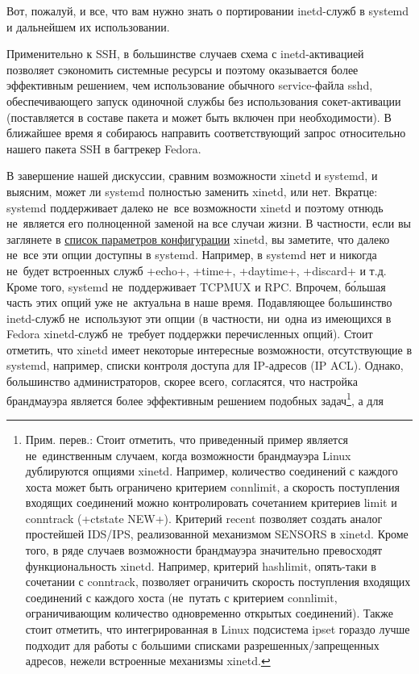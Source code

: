 \documentclass[10pt,oneside,a4paper]{article}
\begin{document}
Вот, пожалуй, и все, что вам нужно знать о портировании inetd-служб в systemd и
дальнейшем их использовании.

Применительно к SSH, в большинстве случаев схема с inetd-активацией позволяет
сэкономить системные ресурсы и поэтому оказывается более эффективным решением,
чем использование обычного service-файла sshd, обеспечивающего запуск одиночной
службы без использования сокет-активации (поставляется в составе пакета и может
быть включен при необходимости). В ближайшее время я собираюсь направить
соответствующий запрос относительно нашего пакета SSH в багтрекер Fedora.

В завершение нашей дискуссии, сравним возможности xinetd и systemd, и выясним,
может ли systemd полностью заменить xinetd, или нет. Вкратце: systemd
поддерживает далеко не~все возможности xinetd и поэтому отнюдь не~является его
полноценной заменой на все случаи жизни. В частности, если вы заглянете в
\href{http://linux.die.net/man/5/xinetd.conf}{список параметров конфигурации}
xinetd, вы заметите, что далеко не~все эти опции доступны в systemd. Например, в
systemd нет и никогда не~будет встроенных служб +echo+, +time+, +daytime+,
+discard+ и т.д. Кроме того, systemd не~поддерживает TCPMUX и RPC. Впрочем,
б\'{о}льшая часть этих опций уже не~актуальна в наше время. Подавляющее
большинство inetd-служб не~используют эти опции (в частности, ни~одна из
имеющихся в Fedora xinetd-служб не~требует поддержки перечисленных опций). Стоит
отметить, что xinetd имеет некоторые интересные возможности, отсутствующие в
systemd, например, списки контроля доступа для IP-адресов (IP ACL). Однако,
большинство администраторов, скорее всего, согласятся, что настройка брандмауэра
является более эффективным решением подобных задач\footnote{Прим. перев.: Стоит
отметить, что приведенный пример является не~единственным случаем, когда
возможности брандмауэра  Linux дублируются опциями xinetd. Например, количество
соединений с каждого хоста может быть ограничено критерием connlimit, а
скорость поступления входящих соединений можно контролировать сочетанием
критериев limit и conntrack (+ctstate NEW+). Критерий recent позволяет создать
аналог простейшей IDS/IPS, реализованной механизмом SENSORS в xinetd. Кроме
того, в ряде случаев возможности брандмауэра значительно превосходят
функциональность xinetd. Например, критерий hashlimit, опять-таки в сочетании с
conntrack, позволяет ограничить скорость поступления входящих соединений с
каждого хоста (не~путать с критерием connlimit, ограничивающим количество
одновременно открытых соединений). Также стоит отметить, что интегрированная в
Linux подсистема ipset гораздо лучше подходит для работы с большими списками
разрешенных/запрещенных адресов, нежели встроенные механизмы xinetd.}, а для
\end{document}
